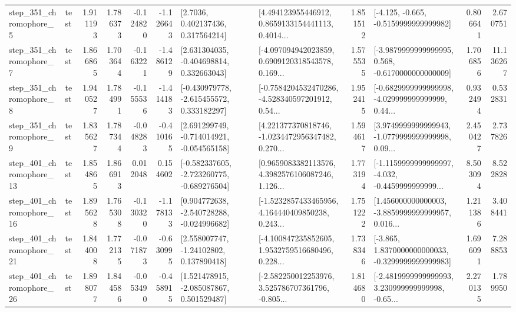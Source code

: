 \begin{tabular}{llrrrrllrlrr}
   step\_351\_chromophore\_5 &      test &      1.911193 &    1.786373 &     -0.124820 & -1.126643 &          [2.7036, 0.402137436, 0.317564214] &  [4.494123955446912, 0.8659133154441113, 0.4014... &       1.851512 &              [-4.125, -0.665, -0.5159999999999982] &            0.806641 &          2.670751 \\
   step\_351\_chromophore\_7 &      test &      1.866865 &    1.703644 &     -0.163221 & -1.486129 &    [2.631304035, -0.404698814, 0.332663043] &  [-4.097094942023859, 0.6909120318543578, 0.169... &       1.575535 &  [-3.9879999999999995, 0.568, -0.6170000000000009] &            1.706856 &         11.136267 \\
   step\_351\_chromophore\_8 &      test &      1.940527 &    1.784991 &     -0.155536 & -1.414183 &   [-0.430979778, -2.615455572, 0.333182297] &  [-0.7584204532470286, -4.528340597201912, 0.54... &       1.952415 &  [-0.6829999999999998, -4.029999999999999, 0.44... &            0.932494 &          0.532831 \\
   step\_351\_chromophore\_9 &      test &      1.835627 &    1.787344 &     -0.048283 & -0.410165 &   [2.691299749, -0.714014921, -0.054565158] &  [4.221377370818746, -1.0234472956347482, 0.270... &       1.594617 &  [3.9749999999999943, -1.0779999999999998, 0.09... &            2.450427 &          2.737826 \\
  step\_401\_chromophore\_13 &      test &      1.854865 &    1.866913 &      0.012048 &  0.154602 &  [-0.582337605, -2.723260775, -0.689276504] &  [0.9659083382113576, 4.3982576106087246, 1.126... &       1.773194 &  [-1.1159999999999997, -4.032, -0.4459999999999... &            8.503094 &          8.522828 \\
  step\_401\_chromophore\_16 &      test &      1.895628 &    1.765308 &     -0.130320 & -1.178133 &   [0.904772638, -2.540728288, -0.024996682] &  [-1.5232857433465956, 4.164440409850238, 0.243... &       1.751222 &  [1.456000000000003, -3.8859999999999957, 0.016... &            1.211386 &          3.408441 \\
  step\_401\_chromophore\_21 &      test &      1.844008 &    1.772135 &     -0.071873 & -0.630995 &     [2.558007747, -1.24102802, 0.137890418] &  [-4.100847235852605, 1.9532759516680496, 0.228... &       1.738346 &  [-3.865, 1.8370000000000033, -0.3299999999999983] &            1.696091 &          7.288853 \\
  step\_401\_chromophore\_26 &      test &      1.898077 &    1.844586 &     -0.053490 & -0.458915 &    [1.521478915, -2.085087867, 0.501529487] &  [-2.582250012253976, 3.525786707361796, -0.805... &       1.814680 &  [-2.4819999999999993, 3.230999999999998, -0.65... &            2.270135 &          1.789950 \\

\end{tabular}
